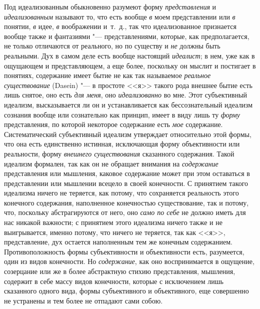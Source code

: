 Под идеализованным обыкновенно разумеют форму {\em представления} и
{\em идеализованным} называют то, что есть вообще
{\em в} моем представлении или {\em в} понятии, {\em в} идее,
{\em в} воображении и~т.~д., так что идеализованное
признается вообще также и фантазиями "--- представлениями, которые, как
предполагается, не только отличаются от реального, но по существу и
{\em не} должны быть реальными. Дух в самом деле есть
вообще настоящий {\em идеалист}; в нем, уже как в
ощущающем и представляющем, а еще более, поскольку он мыслит и постигает в
понятиях, содержание имеет бытие не как так называемое
{\em реальное существование} (Dasein) "--- в простоте <<я>>
такого рода внешнее бытие есть лишь снятое, оно есть {\em для меня}, оно
{\em идеализованно} во мне. Этот субъективный идеализм,
высказывается ли он и устанавливается как бессознательный идеализм сознания
вообще или сознательно как принцип, имеет в виду лишь ту
{\em форму} представления, по которой некоторое
содержание есть {\em мое} содержание. Систематический
субъективный идеализм утверждает относительно этой формы, что она есть
единственно истинная, исключающая форму объективности или реальности, форму
{\em внешнего существования} сказанного содержания.
Такой идеализм формален, так как он не обращает внимания на
{\em содержание} представления или мышления, каковое
содержание может при этом оставаться в представлении или мышлении всецело в
своей конечности. С принятием такого идеализма ничего не теряется, как
потому, что сохраняется реальность этого конечного содержания, наполненное
конечностью существование, так и потому, что, поскольку абстрагируются от
него, оно {\em само по себе} не должно иметь для нас
никакой важности; с принятием этого идеализма ничего также и не
выигрывается, именно потому, что ничего не теряется, так как <<я>>,
представление, дух остается наполненным тем же конечным содержанием.
Противоположность формы субъективности и объективности есть, разумеется,
один из видов конечности. Но {\em содержание}, как оно
воспринимается в ощущение, созерцание или же в более абстрактную стихию
представления, мышления, содержит в себе массу видов конечности, которые с
исключением лишь сказанного одного вида, формы субъективного и
объективного, еще совершенно не устранены и тем более не отпадают сами собою.

\bigskip

